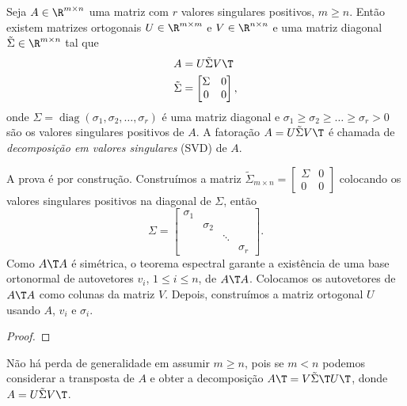\documentclass{article}
\DeclareMathOperator{\diag}{diag}
\begin{document}
\begin{thm} \label{thm:svd}
    Seja \(A \in \R^{m \times n}\) uma matriz com \(r\) valores singulares positivos, \(m \geq n\). Então existem matrizes ortogonais \(U \in \R^{m \times m}\) e \(V \in \R^{n \times n}\) e uma matriz diagonal \(\tilde{\Sigma} \in \R^{m \times n}\) tal que
    \begin{align}
        A &= U \tilde{\Sigma} V\T  \\
        \tilde{\Sigma} &= \begin{bmatrix}
            \Sigma & 0 \\
            0 & 0
        \end{bmatrix},
    \end{align} onde \(\Sigma = \diag(\sigma_1, \sigma_2, \ldots, \sigma_r)\) é uma matriz diagonal e \(\sigma_1 \geq \sigma_2 \geq \ldots \geq \sigma_r > 0\) são os valores singulares positivos de \(A\). A fatoração \(A = U \tilde{\Sigma} V\T \) é chamada de \emph{decomposição em valores singulares} (SVD) de \(A\).
\end{thm}

A prova é por construção. Construímos a matriz \(\tilde{\Sigma}_{m \times n} = \begin{bmatrix}
    \Sigma & 0 \\
    0 & 0
\end{bmatrix}\) colocando os valores singulares positivos na diagonal de \(\Sigma\), então \[\Sigma = \begin{bmatrix}
    \sigma_1 & & & \\
    & \sigma_2 & & \\
    & & \ddots & \\
    & & & \sigma_r
\end{bmatrix}.
\] 
Como \(A\T A\) é simétrica, o teorema espectral garante a existência de uma base ortonormal de autovetores \(v_i\), \(1 \leq i \leq n\), de \(A\T A\). Colocamos os autovetores de \(A\T A\) como colunas da matriz \(V\). Depois, construímos a matriz ortogonal \(U\) usando \(A\), \(v_i\) e \(\sigma_i\).

\begin{proof}
    
\end{proof}

\begin{rem}
    Não há perda de generalidade em assumir \(m \geq n\), pois se \(m < n\) podemos considerar a transposta de \(A\) e obter a decomposição \(A\T  = V \tilde{\Sigma}\T  U\T \), donde \(A = U \tilde{\Sigma} V\T \).
\end{rem}
\end{document}
